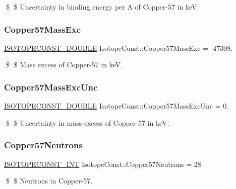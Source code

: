 \$ \$ Uncertainty in binding energy per A of Copper-\/57 in keV. \mbox{\label{group___isotope_const-_copper-_cu57_ga2e926b949fa8854d1a3871e2b3c267ba}} 
\subsubsection{\texorpdfstring{Copper57\+Mass\+Exc}{Copper57MassExc}}
{\footnotesize\ttfamily \mbox{\hyperlink{group___isotope_const-_macros_ga8f45a7272ce02c0b4c65c44636ed719a}{I\+S\+O\+T\+O\+P\+E\+C\+O\+N\+S\+T\+\_\+\+D\+O\+U\+B\+LE}} Isotope\+Const\+::\+Copper57\+Mass\+Exc = -\/47308.}

\$ \$ Mass excess of Copper-\/57 in keV. \mbox{\label{group___isotope_const-_copper-_cu57_gacaaf8e89f376b092c762923596f4d8b1}} 
\subsubsection{\texorpdfstring{Copper57\+Mass\+Exc\+Unc}{Copper57MassExcUnc}}
{\footnotesize\ttfamily \mbox{\hyperlink{group___isotope_const-_macros_ga8f45a7272ce02c0b4c65c44636ed719a}{I\+S\+O\+T\+O\+P\+E\+C\+O\+N\+S\+T\+\_\+\+D\+O\+U\+B\+LE}} Isotope\+Const\+::\+Copper57\+Mass\+Exc\+Unc = 0.}

\$ \$ Uncertainty in mass excess of Copper-\/57 in keV. \mbox{\label{group___isotope_const-_copper-_cu57_gaed57b640c31c1c8d2eccb4aaa1f17a51}} 
\subsubsection{\texorpdfstring{Copper57\+Neutrons}{Copper57Neutrons}}
{\footnotesize\ttfamily \mbox{\hyperlink{group___isotope_const-_macros_ga5f18360b3e99483a35c32d789e62621c}{I\+S\+O\+T\+O\+P\+E\+C\+O\+N\+S\+T\+\_\+\+I\+NT}} Isotope\+Const\+::\+Copper57\+Neutrons = 28}

\$ \$ Neutrons in Copper-\/57. \mbox{\label{group___isotope_const-_copper-_cu57_gaebebfe4b86b98b426e4257717f9cb1a7}} 

